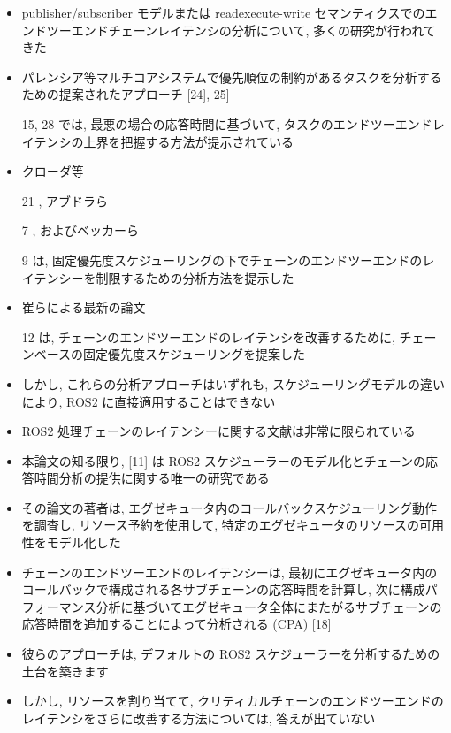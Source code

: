 \begin{frame}{}
    \begin{itemize}
        \item publisher/subscriber モデルまたは readexecute-write セマンティクスでのエンドツーエンドチェーンレイテンシの分析について, 多くの研究が行われてきた
\item パレンシア等マルチコアシステムで優先順位の制約があるタスクを分析するための提案されたアプローチ [24], 25]
\item [15, 28] では, 最悪の場合の応答時間に基づいて, タスクのエンドツーエンドレイテンシの上界を把握する方法が提示されている
\item クローダ等
\item [21], アブドラら
\item [7], およびベッカーら
\item [9] は, 固定優先度スケジューリングの下でチェーンのエンドツーエンドのレイテンシーを制限するための分析方法を提示した
\item 崔らによる最新の論文
\item [12]は, チェーンのエンドツーエンドのレイテンシを改善するために, チェーンベースの固定優先度スケジューリングを提案した
\item しかし, これらの分析アプローチはいずれも, スケジューリングモデルの違いにより, ROS2 に直接適用することはできない
    \end{itemize}
\end{frame}

\begin{frame}{}
    \begin{itemize}
        \item ROS2 処理チェーンのレイテンシーに関する文献は非常に限られている
\item 本論文の知る限り, [11] は ROS2 スケジューラーのモデル化とチェーンの応答時間分析の提供に関する唯一の研究である
\item その論文の著者は, エグゼキュータ内のコールバックスケジューリング動作を調査し, リソース予約を使用して, 特定のエグゼキュータのリソースの可用性をモデル化した
\item チェーンのエンドツーエンドのレイテンシーは, 最初にエグゼキュータ内のコールバックで構成される各サブチェーンの応答時間を計算し, 次に構成パフォーマンス分析に基づいてエグゼキュータ全体にまたがるサブチェーンの応答時間を追加することによって分析される (CPA) [18]
\item 彼らのアプローチは, デフォルトの ROS2 スケジューラーを分析するための土台を築きます
\item しかし, リソースを割り当てて, クリティカルチェーンのエンドツーエンドのレイテンシをさらに改善する方法については, 答えが出ていない
    \end{itemize}
\end{frame}
